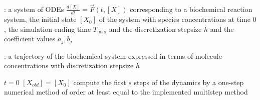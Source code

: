 \begin{algorithm}[H]
\DontPrintSemicolon
{}

\caption{\protect\TitleFunction{}}
\label{algo:midpoint}

\Input: a system of ODEs $\frac{d[X]}{dt} = \vec{F}(t, [X])$ corresponding to a biochemical reaction system, the initial state $[X_0]$ of the system with species concentrations at time $0$, the simulation ending time $T_{\max}$ and the discretization stepsize $h$ and the coefficient values $a_j, b_j$\;

\Output: a trajectory of the biochemical system expressed in terms of molecule concentrations with discretization stepsize $h$\;

$t = 0$\;
$[X_{old}] = [X_0]$\;
compute the first $s$ steps of the dynamics by a one-step numerical method of order at least equal to the implemented multistep method\;

\end{algorithm}
